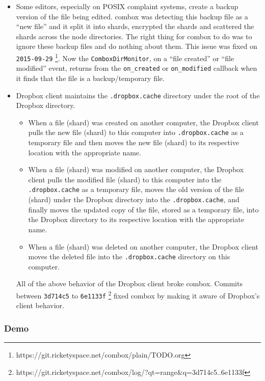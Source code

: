 \begin{itemize}
\item Some editors, especially on POSIX complaint systems, create a
  backup version of the file being edited. combox was detecting this
  backup file as a ``new file'' and it split it into shards, encrypted
  the shards and scattered the shards across the node directories. The
  right thing for combox to do was to ignore these backup files and do
  nothing about them. This issue was fixed on \verb+2015-09-29+
  \footnote{https://git.ricketyspace.net/combox/plain/TODO.org}. Now
  the \verb+ComboxDirMonitor+, on a ``file created'' or ``file
  modified'' event, returns from the \verb+on_created+ or
  \verb+on_modified+ callback when it finds that the file is a
  backup/temporary file.
\item Dropbox client maintains the \verb+.dropbox.cache+ directory
  under the root of the Dropbox directory.

  \begin{itemize}
  \item When a file (shard) was created on another computer, the
    Dropbox client pulls the new file (shard) to this computer into
    \verb+.dropbox.cache+ as a temporary file and then moves the new
    file (shard) to its respective location with the appropriate name.
  \item When a file (shard) was modified on another computer, the
    Dropbox client pulls the modified file (shard) to this computer
    into the \verb+.dropbox.cache+ as a temporary file, moves the old
    version of the file (shard) under the Dropbox directory into the
    \verb+.dropbox.cache+, and finally moves the updated copy of the
    file, stored as a temporary file, into the Dropbox directory to
    its respective location with the appropriate name.
  \item When a file (shard) was deleted on another computer, the
    Dropbox client moves the deleted file into the
    \verb+.dropbox.cache+ directory on this computer.
  \end{itemize}

  All of the above behavior of the Dropbox client broke
  combox. Commits between \verb+3d714c5+ to \verb+6e1133f+
  \footnote{https://git.ricketyspace.net/combox/log/?qt=range\&q=3d714c5..6e1133f}
  fixed combox by making it aware of Dropbox's client behavior.
\end{itemize}

\subsubsection{Demo}


